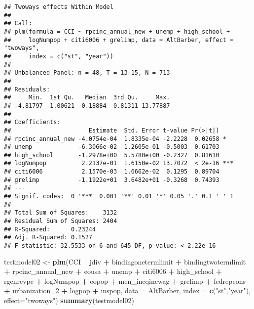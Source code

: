 \documentclass[]{article}
\newenvironment{Shaded}{\begin{snugshade}}{\end{snugshade}}
\newcommand{\KeywordTok}[1]{\textcolor[rgb]{0.13,0.29,0.53}{\textbf{#1}}}
\newcommand{\DataTypeTok}[1]{\textcolor[rgb]{0.13,0.29,0.53}{#1}}
\newcommand{\DecValTok}[1]{\textcolor[rgb]{0.00,0.00,0.81}{#1}}
\newcommand{\StringTok}[1]{\textcolor[rgb]{0.31,0.60,0.02}{#1}}
\newcommand{\OperatorTok}[1]{\textcolor[rgb]{0.81,0.36,0.00}{\textbf{#1}}}
\newcommand{\NormalTok}[1]{#1}
\begin{document}
\begin{verbatim}
## Twoways effects Within Model
## 
## Call:
## plm(formula = CCI ~ rpcinc_annual_new + unemp + high_school + 
##     logNumpop + citi6006 + grelimp, data = AltBarber, effect = "twoways", 
##     index = c("st", "year"))
## 
## Unbalanced Panel: n = 48, T = 13-15, N = 713
## 
## Residuals:
##     Min.  1st Qu.   Median  3rd Qu.     Max. 
## -4.81797 -1.00621 -0.18884  0.81311 13.77887 
## 
## Coefficients:
##                      Estimate  Std. Error t-value Pr(>|t|)    
## rpcinc_annual_new -4.0754e-04  1.8335e-04 -2.2228  0.02658 *  
## unemp             -6.3066e-02  1.2605e-01 -0.5003  0.61703    
## high_school       -1.2978e+00  5.5780e+00 -0.2327  0.81610    
## logNumpop          2.2137e-01  1.6150e-02 13.7072  < 2e-16 ***
## citi6006           2.1570e-03  1.6662e-02  0.1295  0.89704    
## grelimp           -1.1922e+01  3.6482e+01 -0.3268  0.74393    
## ---
## Signif. codes:  0 '***' 0.001 '**' 0.01 '*' 0.05 '.' 0.1 ' ' 1
## 
## Total Sum of Squares:    3132
## Residual Sum of Squares: 2404
## R-Squared:      0.23244
## Adj. R-Squared: 0.1527
## F-statistic: 32.5533 on 6 and 645 DF, p-value: < 2.22e-16
\end{verbatim}

\begin{Shaded}
\begin{Highlighting}[]
\NormalTok{testmodel02 <-}\StringTok{ }\KeywordTok{plm}\NormalTok{(CCI }\OperatorTok{~}\StringTok{ }\NormalTok{jdiv }\OperatorTok{+}\StringTok{ }\NormalTok{bindingonetermlimit }\OperatorTok{+}\StringTok{ }\NormalTok{bindingtwotermlimit }\OperatorTok{+}\StringTok{ }\NormalTok{rpcinc_annual_new }\OperatorTok{+}\StringTok{ }\NormalTok{eousa }\OperatorTok{+}\StringTok{ }\NormalTok{unemp }\OperatorTok{+}\StringTok{ }\NormalTok{citi6006 }\OperatorTok{+}\StringTok{ }\NormalTok{high_school }\OperatorTok{+}\StringTok{ }\NormalTok{rgenrevpc }\OperatorTok{+}\StringTok{ }\NormalTok{logNumpop }\OperatorTok{+}\StringTok{ }\NormalTok{eopop }\OperatorTok{+}\StringTok{ }\NormalTok{men_ineqincwag }\OperatorTok{+}\StringTok{ }\NormalTok{grelimp }\OperatorTok{+}\StringTok{ }\NormalTok{fedrepcons }\OperatorTok{+}\StringTok{ }\NormalTok{urbanization_}\DecValTok{2} \OperatorTok{+}\StringTok{ }\NormalTok{logpop }\OperatorTok{+}\StringTok{ }\NormalTok{inspop, }\DataTypeTok{data =}\NormalTok{ AltBarber, }\DataTypeTok{index =} \KeywordTok{c}\NormalTok{(}\StringTok{"st"}\NormalTok{,}\StringTok{"year"}\NormalTok{), }\DataTypeTok{effect=}\StringTok{"twoways"}\NormalTok{)}
\KeywordTok{summary}\NormalTok{(testmodel02)}
\end{Highlighting}
\end{Shaded}
\end{document}
